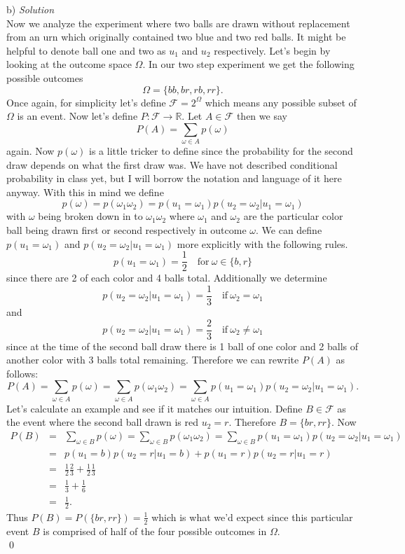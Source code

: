 \documentclass[10pt]{amsart}
\begin{document}
\noindent
b) \textit{ Solution} \\
Now we analyze the experiment where two balls are drawn without replacement from an urn which originally contained two blue and two red balls.
It might be helpful to denote ball one and two as $u_1$ and $u_2$ respectively.
Let's begin by looking at the outcome space $\Omega$. 
In our two step experiment we get the following possible outcomes 
$$\Omega = \{bb, br, rb, rr\}.$$
Once again, for simplicity let's define $\mathcal{F} = 2^\Omega$ which means any possible subset of $\Omega$ is an event.
Now let's define $P: \mathcal{F} \rightarrow \mathds{R}$.
Let $A \in \mathcal{F}$ then we say $$P(A) = \sum_{\omega \in A} p(\omega)$$ again.
Now $p(\omega)$ is a little tricker to define since the probability for the second draw depends on what the first draw was. 
We have not described conditional probability in class yet, but I will borrow the notation and language of it here anyway.
With this in mind we define
$$ p(\omega) = p(\omega_1\omega_2)= p(u_1 = \omega_1) p(u_2 = \omega_2 | u_1 = \omega_1)$$ with $\omega$ being broken down in to $\omega_1\omega_2$ where $\omega_1$ and $\omega_2$ are the particular color ball being drawn first or second respectively in outcome $\omega$.
We can define $p(u_1 = \omega_1)$ and $p(u_2 = \omega_2 | u_1 = \omega_1)$ more explicitly with the following rules.
$$
p(u_1 = \omega_1) = \frac{1}{2} \quad \text{for} \: \omega \in \{b, r\}
$$
since there are 2 of each color and 4 balls total.
Additionally we determine
$$p(u_2 = \omega_2 | u_1 = \omega_1) = \frac{1}{3} \quad \text{if} \: \omega_2 = \omega_1$$
and
$$p(u_2 = \omega_2 | u_1 = \omega_1) = \frac{2}{3} \quad \text{if} \: \omega_2 \neq \omega_1$$
since at the time of the second ball draw there is 1 ball of one color and 2 balls of another color with 3 balls total remaining.
Therefore we can rewrite $P(A)$ as follows:
$$P(A) = \sum_{\omega \in A} p(\omega) = \sum_{\omega \in A} p(\omega_1\omega_2)= \sum_{\omega \in A} p(u_1 = \omega_1) p(u_2 = \omega_2 | u_1 = \omega_1).$$
Let's calculate an example and see if it matches our intuition.
Define $B \in \mathcal{F}$ as the event where the second ball drawn is red $u_2 = r$.
Therefore $B = \{br, rr\}$. Now
\begin{eqnarray*}
P(B) &=& \sum_{\omega \in B} p(\omega) = \sum_{\omega \in B} p(\omega_1\omega_2) = \sum_{\omega \in B} p(u_1 = \omega_1) p(u_2 = \omega_2 | u_1 = \omega_1)\\
&=& p(u_1 = b) p(u_2 = r | u_1 = b) + p(u_1 = r) p(u_2 = r | u_1 = r) \\
&=& \frac{1}{2} \frac{2}{3} + \frac{1}{2} \frac{1}{3} \\
&=& \frac{1}{3} + \frac{1}{6} \\
&=& \frac{1}{2}.
\end{eqnarray*}
Thus $P(B) = P(\{br, rr\}) = \frac{1}{2}$ which is what we'd expect since this particular event $B$ is comprised of half of the four possible outcomes in $\Omega$.
\\
\qed
\end{document}
